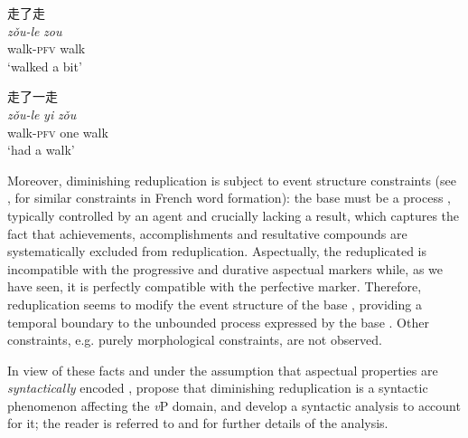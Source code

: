 \documentclass[output=paper]{langsci/langscibook}
\begin{document}
\ea\label{ex:BascianoMelloni:5}

  \ea 走了走\\
  \gll \emph{zǒu-le} \emph{zou}\\
  walk-\textsc{pfv} walk\\
  \glt `walked a bit'

  \ex 走了一走\\
  \gll \emph{zǒu-le} \emph{yi} \emph{zǒu}\\
  walk-\textsc{pfv} one walk\\
  \glt `had a walk'

  \z
\z

Moreover, diminishing reduplication is subject to event structure
constraints %
(see %
\citealt{Fradin03b}%
, for similar constraints in French word formation): the base  must be a process , typically
controlled by an agent and crucially lacking a result, which captures
the fact that achievements, accomplishments and resultative compounds
are systematically excluded from reduplication. Aspectually, the
reduplicated  is incompatible with the progressive and durative
aspectual markers while, as we have seen, it is perfectly compatible
with the perfective  marker. Therefore, reduplication seems to
modify the event structure of the base , providing a temporal
boundary to the unbounded process expressed by the base %
\citep[see][]{XiaoMcEnery2004}%
%
. Other constraints, e.g. purely morphological constraints,
are not observed.

In view of these facts and under the assumption that aspectual
properties are \emph{syntactically} encoded %
\citep[see e.g.][]{Travis2000,Travis2010,Borer1994,Borer2005,McClure1995,Ramchand2008}%
%
, %
%
\citet{ArcodiaBascianoEtAl2014} %
%
propose that diminishing reduplication is a syntactic
phenomenon affecting the \emph{v}P domain, and develop a syntactic
analysis to account for it; the reader is referred to %
\citet{ArcodiaBascianoEtAl2014} %
%
and %
\citet{BascianoMelloni2017} %
%
for further details of
the analysis.
\end{document}
